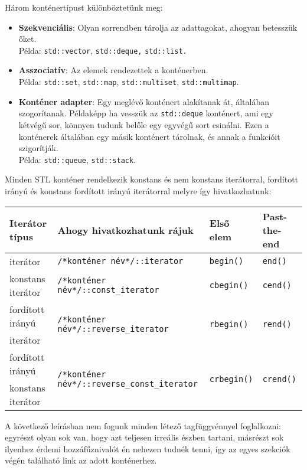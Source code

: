 \documentclass[../cpp_book/cpp_book.tex]{subfiles}
\begin{document}
	Három konténertípust különböztetünk meg:
	\begin{itemize}
		\item \textbf{Szekvenciális}: Olyan sorrendben tárolja az adattagokat, ahogyan betesszük őket. \\Példa: \texttt{std::vector}, \texttt{std::deque,} \texttt{std::list.}
		\item \textbf{Asszociatív}: Az elemek rendezettek a konténerben.\\ Példa: \texttt{std::set}, \texttt{std::map}, \texttt{std::multiset}, \texttt{std::multimap}.
		\item \textbf{Konténer adapter}: Egy meglévő konténert alakítanak át, általában szogorítanak. Példaképp ha vesszük az \texttt{std::deque} konténert, ami egy kétvégű sor, könnyen tudunk belőle egy egyvégű sort csinálni. Ezen a konténerek általában egy másik konténert tárolnak, és annak a funkcióit szigorítják.
		\\Példa: \texttt{std::queue}, \texttt{std::stack}.
	\end{itemize}
	Minden STL konténer rendelkezik konstans és nem konstans iterátorral, fordított irányú és konstans fordított irányú iterátorral melyre így hivatkozhatunk:
	\begin{center}
		\setlength{\extrarowheight}{2pt}
		\begin{tabular}{|l|l|l|l|}
			\hline
			Iterátor típus&Ahogy hivatkozhatunk rájuk&Első elem&Past-the-end\\
			\hline
			\hline
			iterátor&\texttt{/*konténer név*/::iterator}&\texttt{begin()}&\texttt{end()}\\
			\hline
			konstans iterátor&\texttt{/*konténer név*/::const\_iterator}&\texttt{cbegin()}&\texttt{cend()}\\
			\hline
			fordított irányú&\multirow{2}{*}{\texttt{/*konténer név*/::reverse\_iterator}}&\multirow{2}{*}{\texttt{rbegin()}}&\multirow{2}{*}{\texttt{rend()}}\\
			iterátor&&&\\
			\hline
			fordított irányú&\multirow{2}{*}{\texttt{/*konténer név*/::reverse\_const\_iterator}}&\multirow{2}{*}{\texttt{crbegin()}}&\multirow{2}{*}{\texttt{crend()}}\\
			konstans iterátor&&&\\
			\hline
		\end{tabular}
	\end{center}
	
	A következő leírásban nem fogunk minden létező tagfüggvénnyel foglalkozni: egyrészt olyan sok van, hogy azt teljesen irreális észben tartani, másrészt sok ilyenhez érdemi hozzáfűznivalót én nehezen tudnék tenni, így az egyes szekciók végén található link az adott konténerhez.
	
\end{document}
